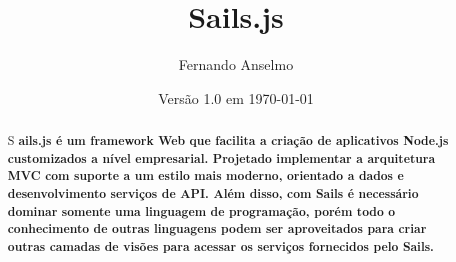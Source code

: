 \documentclass[a4paper,11pt]{article}
\title{Sails.js}
\author{Fernando Anselmo}
\date{Versão 1.0 em \today} %
\newcommand{\initial}[1]{ %
  \lettrine[lines=3,lhang=0.3,nindent=0em]{
    \color{DarkGoldenrod}
    {\textsf{#1}}
  }{}
}
\begin{document}
\maketitle %
\thispagestyle{fancy} %


\begin{abstract}
\initial{S}\textbf{ails.js\cite{sailsoficial} é um framework Web que facilita 
a criação de aplicativos Node.js customizados a nível empresarial. Projetado implementar a arquitetura MVC com suporte a um estilo mais moderno, orientado a dados e desenvolvimento serviços de API. Além disso, com Sails é necessário dominar somente uma linguagem de programação, porém todo o conhecimento de outras linguagens podem ser aproveitados para criar outras camadas de visões para acessar os serviços fornecidos pelo Sails.}
\end{abstract}
\vspace{20pt}

\end{document}
